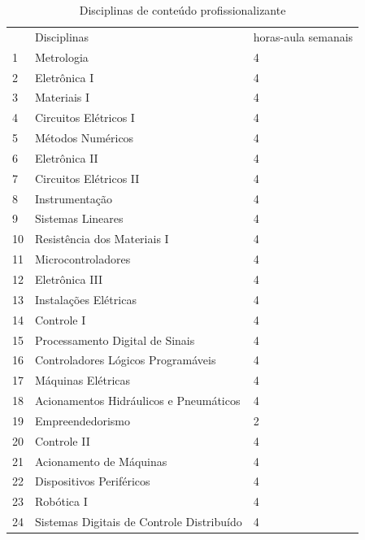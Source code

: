 \documentclass{paper}
\begin{document}
\if{}
    \begin{longtable}{|p{0.8cm}|p{7.5cm}|p{2.0cm}|}
    \caption{Disciplinas de conteúdo profissionalizante}\label{tab6} 
    \vspace{-0.25cm}
    \\ \hline 
    \cellcolor{\cinza} & \cellcolor{\cinza}Disciplinas & \cellcolor{\cinza}horas-aula semanais  \\ 
    \hline
     1 &  Metrologia  &  4 \\ \hline
     2 &  Eletrônica I  &  4 \\ \hline
     3 &  Materiais I  &  4 \\ \hline
     4 &  Circuitos Elétricos I  &  4 \\ \hline
     5 &  Métodos Numéricos  &  4 \\ \hline
     6 &  Eletrônica II  &  4 \\ \hline
     7 &  Circuitos Elétricos II  &  4 \\ \hline
     8 &  Instrumentação  &  4 \\ \hline
     9 &  Sistemas Lineares  &  4 \\ \hline
     10 &  Resistência dos Materiais I  &  4 \\ \hline
     11 &  Microcontroladores  &  4 \\ \hline
     12 &  Eletrônica III  &  4 \\ \hline
     13 &  Instalações Elétricas  &  4 \\ \hline
     14 &  Controle I  &  4 \\ \hline
     15 &  Processamento Digital de Sinais  &  4 \\ \hline
     16 &  Controladores Lógicos Programáveis  &  4 \\ \hline
     17 &  Máquinas Elétricas  &  4 \\ \hline
     18 &  Acionamentos Hidráulicos e Pneumáticos  &  4 \\ \hline
     19 &  Empreendedorismo  &  2 \\ \hline
     20 &  Controle II  &  4 \\ \hline
     21 &  Acionamento de Máquinas  &  4 \\ \hline
     22 &  Dispositivos Periféricos  &  4 \\ \hline
     23 &  Robótica I  &  4 \\ \hline
     24 &  Sistemas Digitais de Controle Distribuído  &  4 \\ \hline

\end{longtable}
\end{document}
